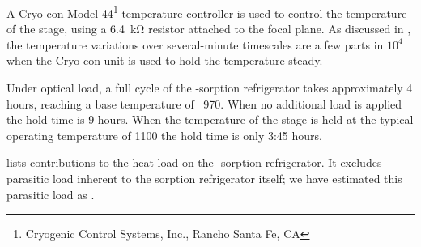 A Cryo-con Model 44\footnote{%
  Cryogenic Control Systems, Inc., Rancho Santa Fe, CA}
temperature controller is used to control the temperature of the stage, using a \SI{6.4}{\kilo\ohm} resistor attached to the focal plane.
As discussed in , the temperature variations over several-minute timescales are a few parts in $10^4$ when the Cryo-con unit is used to hold the temperature steady.

Under optical load, a full cycle of the -sorption refrigerator takes approximately 4 hours, reaching a base temperature of ~\SI{970}{\mK}.
When no additional load is applied the hold time is 9 hours.
When the temperature of the stage is held at the typical operating temperature of \SI{1100}{\mK} the hold time is only 3:45 hours.

 lists contributions to the heat load on the -sorption refrigerator.
It excludes parasitic load inherent to the sorption refrigerator itself; we have estimated this parasitic load as .



